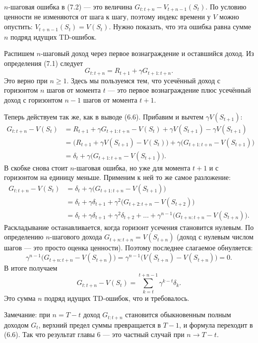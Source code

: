 \begin{solution}
    $n$-шаговая ошибка в (7.2) --- это величина $G_{t:t+n} - V_{t+n-1}(S_t)$. По условию ценности не изменяются от шага к шагу, поэтому индекс времени у $V$ можно опустить: $V_{t+n-1}(S_t) = V(S_t)$. Нужно показать, что эта ошибка равна сумме $n$ подряд идущих TD-ошибок.

    Распишем $n$-шаговый доход через первое вознаграждение и оставшийся доход. Из определения (7.1) следует
    \[
    G_{t:t+n} = R_{t+1} + \gamma G_{t+1:t+n}.
    \]
    Это верно при $n \ge 1$. Здесь мы пользуемся тем, что усечённый доход с горизонтом $n$ шагов от момента $t$ --- это первое вознаграждение плюс усечённый доход с горизонтом $n-1$ шагов от момента $t+1$.

    Теперь действуем так же, как в выводе (6.6). Прибавим и вычтем $\gamma V(S_{t+1})$:
    \begin{align*}
        G_{t:t+n} - V(S_t) &= R_{t+1} + \gamma G_{t+1:t+n} - V(S_t) + \gamma V(S_{t+1}) - \gamma V(S_{t+1}) \\
        &= \bigl(R_{t+1} + \gamma V(S_{t+1}) - V(S_t)\bigr) + \gamma\bigl(G_{t+1:t+n} - V(S_{t+1})\bigr) \\
        &= \delta_t + \gamma\bigl(G_{t+1:t+n} - V(S_{t+1})\bigr).
    \end{align*}
    В скобке снова стоит $n$-шаговая ошибка, но уже для момента $t+1$ и с горизонтом на единицу меньше. Применим к ней то же самое разложение:
    \begin{align*}
        G_{t:t+n} - V(S_t) &= \delta_t + \gamma\bigl(G_{t+1:t+n} - V(S_{t+1})\bigr) \\
        &= \delta_t + \gamma \delta_{t+1} + \gamma^2 \bigl(G_{t+2:t+n} - V(S_{t+2})\bigr) \\
        &= \delta_t + \gamma \delta_{t+1} + \gamma^2 \delta_{t+2} + \dots + \gamma^{n-1}\bigl(G_{t+n:t+n} - V(S_{t+n})\bigr).
    \end{align*}
    Раскладывание останавливается, когда горизонт усечения становится нулевым. По определению $n$-шагового дохода $G_{t+n:t+n} = V(S_{t+n})$ (доход с нулевым числом шагов --- это просто оценка ценности). Поэтому последнее слагаемое обнуляется:
    \[
    \gamma^{n-1}\bigl(G_{t+n:t+n} - V(S_{t+n})\bigr) = \gamma^{n-1}\bigl(V(S_{t+n}) - V(S_{t+n})\bigr) = 0.
    \]
    В итоге получаем
    \[
    G_{t:t+n} - V(S_t) = \sum_{k=t}^{t+n-1} \gamma^{k-t} \delta_k.
    \]
    Это сумма $n$ подряд идущих TD-ошибок, что и требовалось.

    Замечание: при $n = T - t$ доход $G_{t:t+n}$ становится обыкновенным полным доходом $G_t$, верхний предел суммы превращается в $T-1$, и формула переходит в (6.6). Так что результат главы 6 --- это частный случай при $n \to T-t$.
\end{solution}

